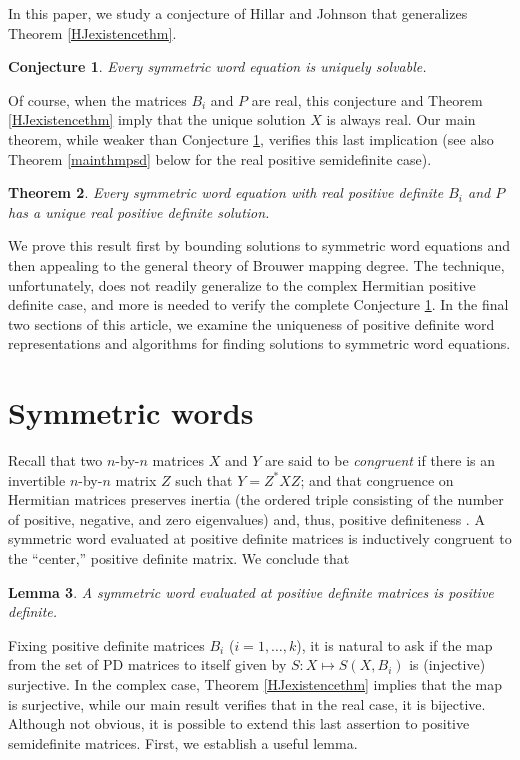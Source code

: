 \documentclass{amsart}
\newtheorem{thm}{Theorem}[section]
\newtheorem{conj}[thm]{Conjecture}
\newtheorem{lem}[thm]{Lemma}
\theoremstyle{definition}
\theoremstyle{remark}
\numberwithin{equation}{section}
\newcommand{\<}{\langle}
\renewcommand{\>}{\rangle}
\begin{document}
In this paper, we study a conjecture \cite{JH2} of Hillar and Johnson that generalizes Theorem \ref{HJexistencethm}.

\begin{conj}\label{mainuniqueconj}
Every symmetric word equation is uniquely solvable.
\end{conj}

Of course, when the matrices $B_i$ and $P$ are real, this conjecture and Theorem \ref{HJexistencethm} imply that the unique solution $X$ is always real.  Our main theorem, while weaker than Conjecture \ref{mainuniqueconj}, verifies this last implication (see also Theorem \ref{mainthmpsd} below for the real positive semidefinite case).

\begin{thm}\label{ourmainthm}
Every symmetric word equation with real positive definite $B_i$ and $P$ has a unique real positive definite solution.
\end{thm}

We prove this result first by bounding solutions to symmetric word equations and then appealing to the general theory of Brouwer mapping degree.  The technique, unfortunately, does not readily generalize to the complex Hermitian positive definite case, and more is needed to verify the complete Conjecture \ref{mainuniqueconj}.  In the final two sections of this article, we examine the uniqueness of positive definite word representations and algorithms for finding solutions to symmetric word equations.

\section{Symmetric words}

Recall that two $n$-by-$n$ matrices $X$ and $Y$ are said to be
{\it congruent} if there is an invertible $n$-by-$n$ matrix $Z$
such that $Y = Z^{*}XZ$; and that congruence on Hermitian matrices
preserves inertia (the ordered triple consisting of the number of
positive, negative, and zero eigenvalues) and, thus, positive
definiteness \cite[p. 223]{HJ1}. A symmetric word evaluated at positive definite matrices is inductively congruent to the ``center,'' positive definite matrix. We conclude that

\begin{lem}\label{symwordpdlem}
A symmetric word evaluated at positive definite matrices is positive
definite.
\end{lem}

Fixing positive definite matrices $B_i$ ($i = 1,\ldots,k$), it is natural to ask if the map from the set of PD matrices to itself given by $S: X \mapsto S(X,B_i)$ is (injective) surjective.  In the complex case, Theorem \ref{HJexistencethm} implies that the map is surjective, while our main result verifies that in the real case, it is bijective.  Although not obvious, it is possible to extend this last assertion to positive semidefinite matrices.  First, we establish a useful lemma.
\end{document}
